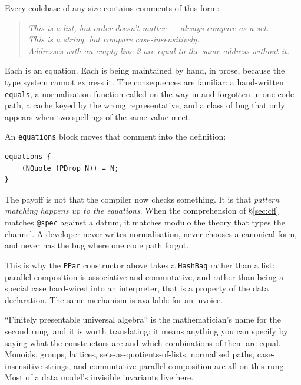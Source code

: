Every codebase of any size contains comments of this form:

\begin{quote}\small
\emph{This is a list, but order doesn't matter --- always compare as a set.}\\
\emph{This is a string, but compare case-insensitively.}\\
\emph{Addresses with an empty line-2 are equal to the same address without it.}
\end{quote}

Each is an equation. Each is being maintained by hand, in prose, because the
type system cannot express it. The consequences are familiar: a hand-written
\texttt{equals}, a normalisation function called on the way in and forgotten in
one code path, a cache keyed by the wrong representative, and a class of bug
that only appears when two spellings of the same value meet.

An \texttt{equations} block moves that comment into the definition:

\begin{lstlisting}[language=mettail]
equations {
    (NQuote (PDrop N)) = N;
}
\end{lstlisting}

The payoff is not that the compiler now checks something. It is that
\emph{pattern matching happens up to the equations}. When the comprehension of
\S\ref{sec:cfl} matches \texttt{@spec} against a datum, it matches modulo the
theory that types the channel. A developer never writes normalisation, never
chooses a canonical form, and never has the bug where one code path forgot.

This is why the \texttt{PPar} constructor above takes a \texttt{HashBag} rather
than a list: parallel composition is associative and commutative, and rather
than being a special case hard-wired into an interpreter, that is a property of
the data declaration. The same mechanism is available for an invoice.

\begin{aside}
``Finitely presentable universal algebra'' is the mathematician's name for the
second rung, and it is worth translating: it means anything you can specify by
saying what the constructors are and which combinations of them are equal.
Monoids, groups, lattices, sets-as-quotients-of-lists, normalised paths,
case-insensitive strings, and commutative parallel composition are all on this
rung. Most of a data model's invisible invariants live here.
\end{aside}

